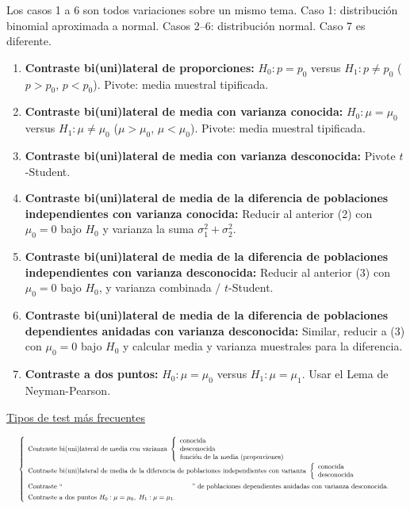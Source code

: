 Los casos 1 a 6 son todos variaciones sobre un mismo tema. Caso 1: distribución binomial aproximada a normal. Casos 2--6: distribución normal. Caso 7 es diferente.
\begin{enumerate}
  \item \textbf{Contraste bi(uni)lateral de proporciones:} $H_0 : p = p_0$ versus $H_1 : p \neq p_0$ ($p > p_0$, $p < p_0$). Pivote: media muestral tipificada.
  \item \textbf{Contraste bi(uni)lateral de media con varianza conocida:} $H_0 : \mu = \mu_0$ versus $H_1 : \mu \neq \mu_0$ ($\mu > \mu_0$, $\mu < \mu_0$). Pivote: media muestral tipificada.
  \item \textbf{Contraste bi(uni)lateral de media con varianza desconocida:} Pivote $t$-Student.
  \item \textbf{Contraste bi(uni)lateral de media de la diferencia de poblaciones independientes con varianza conocida:} Reducir al anterior (2) con $\mu_0 = 0$ bajo $H_0$ y varianza la suma $\sigma_1^2 + \sigma_2^2$.
  \item \textbf{Contraste bi(uni)lateral de media de la diferencia de poblaciones independientes con varianza desconocida:} Reducir al anterior (3) con $\mu_0 = 0$ bajo $H_0$, y varianza combinada / $t$-Student.
  \item \textbf{Contraste bi(uni)lateral de media de la diferencia de poblaciones dependientes anidadas con varianza desconocida:} Similar, reducir a (3) con $\mu_0 = 0$ bajo $H_0$ y calcular media y varianza muestrales para la diferencia.
  \item \textbf{Contraste a dos puntos:} $H_0 : \mu = \mu_0$ versus $H_1 : \mu = \mu_1$. Usar el Lema de Neyman-Pearson.
\end{enumerate}
\noindent\underline{Tipos de test más frecuentes}

\[
  \resizebox{0.98\linewidth}{!}{$
  \left\{
  \begin{array}{l}
    \text{Contraste bi(uni)lateral de media con varianza }
    \left\{
    \begin{array}{l}
      \text{conocida} \\
      \text{desconocida} \\
      \text{función de la media (proporciones)}
    \end{array}
    \right. \\[1.4em]
    \text{Contraste bi(uni)lateral de media de la diferencia de poblaciones independientes con varianza }
    \left\{
    \begin{array}{l}
      \text{conocida} \\
      \text{desconocida}
    \end{array}
    \right. \\[1.1em]
    \text{Contraste ``\hspace{6.7cm}'' de poblaciones dependientes anidadas con varianza desconocida.} \\[0.4em]
    \text{Contraste a dos puntos } H_0 : \mu = \mu_0,\; H_1 : \mu = \mu_1.
  \end{array}
  \right.
  $}
\]


